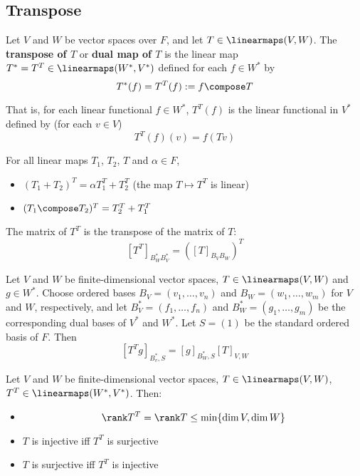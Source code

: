 \subsection{Transpose}

\begin{definition}
  Let $V$ and $W$ be vector spaces over $F$, and let $T \in \linearmaps(V, W)$. The \textbf{transpose of $T$} or \textbf{dual map of $T$} is the linear map $T^* = T^T \in \linearmaps(W^*, V^*)$ defined for each $f \in W^*$ by
  \[
    T^*(f) = T^T(f) := f \compose T
  \]

  That is, for each linear functional $f \in W^*$, $T^T(f)$ is the linear functional in $V^*$ defined by (for each $v \in V$)
  \[
    T^T(f)(v) = f(Tv)
  \]
\end{definition}

\begin{theorem}
  For all linear maps $T_1$, $T_2$, $T$ and $\alpha \in F$,
  \begin{itemize}
    \item $(T_1 + T_2)^T = \alpha T_1^T + T_2^T$ (the map $T \mapsto T^T$ is linear)
    \item $(T_1 \compose T_2)^T = T_2^T + T_1^T$
  \end{itemize}
\end{theorem}

\begin{theorem}
  The matrix of $T^T$ is the transpose of the matrix of $T$:
  \[
    [T^T]_{B_W^* B_V^*} = \left([T]_{B_V B_W}\right)^T
  \]
\end{theorem}

\begin{lemma}
  Let $V$ and $W$ be finite-dimensional vector spaces, $T \in \linearmaps(V, W)$ and $g \in W^*$. Choose ordered bases $B_V = (v_1, \ldots, v_n)$ and $B_W = (w_1, \ldots, w_m)$ for $V$ and $W$, respectively, and let $B_V^* = (f_1, \ldots, f_n)$ and $B_W^* = (g_1, \ldots, g_m)$ be the corresponding dual bases of $V^*$ and $W^*$. Let $S = (1)$ be the standard ordered basis of $F$. Then
  \[
    [T^T g]_{B_v^*,S} = [g]_{B_W^*, S} [T]_{V, W}
  \]
\end{lemma}

\begin{lemma}
  Let $V$ and $W$ be finite-dimensional vector spaces, $T \in \linearmaps(V, W)$, $T^T \in \linearmaps(W^*, V^*)$. Then:
  \begin{itemize}
    \item \[
      \rank T^T = \rank T \leq \min \{ \dim V, \dim W \}
    \]
    \item $T$ is injective iff $T^T$ is surjective
    \item $T$ is surjective iff $T^T$ is injective
  \end{itemize}
\end{lemma}

